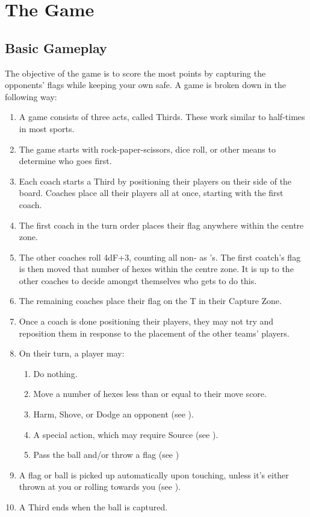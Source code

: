 \chapter{The Game}
\section{Basic Gameplay} \label{basic-gameplay}
The objective of the game is to score the most points by capturing the opponents' flags while keeping your own safe.
A game is broken down in the following way:
\begin{enumerate}
    \item A game consists of three acts, called Thirds.
    These work similar to half-times in most sports.
    \item The game starts with rock-paper-scissors, dice roll, or other means to determine who goes first.
    \item Each coach starts a Third by positioning their players on their side of the board.
    Coaches place all their players all at once, starting with the first coach.
    \item The first coach in the turn order places their flag anywhere within the centre zone.
    \item The other coaches roll 4dF+3, counting all non-\blank{} as \plus{}'s. The first coatch's flag is then moved that number of hexes within the centre zone.
    It is up to the other coaches to decide amongst themselves who gets to do this.
    \item The remaining coaches place their flag on the T in their Capture Zone.
    \item Once a coach is done positioning their players, they may not try and reposition them in response to the placement of the other teams' players.
    \item On their turn, a player may:
    \begin{enumerate}
        \item Do nothing.
        \item Move a number of hexes less than or equal to their move score.
        \item Harm, Shove, or Dodge an opponent (see ).
        \item A special action, which may require Source (see ).
        \item Pass the ball and/or throw a flag (see )
    \end{enumerate}
    \item A flag or ball is picked up automatically upon touching, unless it’s either thrown at you or rolling towards you (see ).
    \item A Third ends when the ball is captured.
\end{enumerate}


